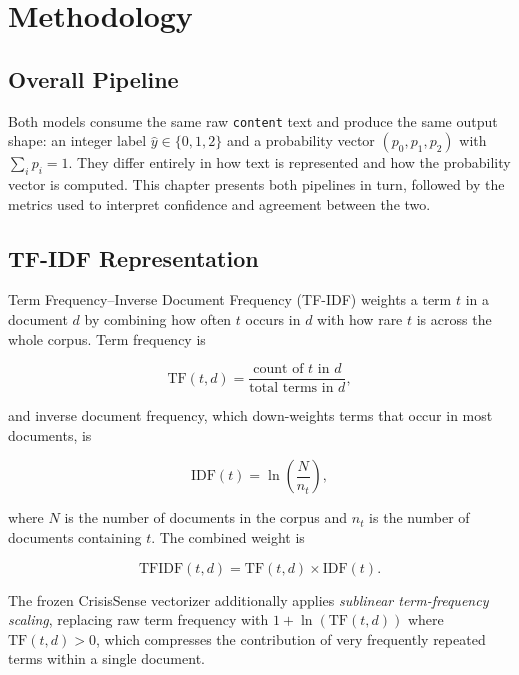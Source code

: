 \chapter{Methodology}
\label{ch:methodology}

\section{Overall Pipeline}

Both models consume the same raw \texttt{content} text and produce the same output shape: an integer label $\hat{y} \in \{0,1,2\}$ and a probability vector $(p_0, p_1, p_2)$ with $\sum_i p_i = 1$. They differ entirely in how text is represented and how the probability vector is computed. This chapter presents both pipelines in turn, followed by the metrics used to interpret confidence and agreement between the two.

\section{TF-IDF Representation}

Term Frequency--Inverse Document Frequency (TF-IDF) weights a term $t$ in a document $d$ by combining how often $t$ occurs in $d$ with how rare $t$ is across the whole corpus. Term frequency is

\begin{equation}
\mathrm{TF}(t,d) = \frac{\text{count of } t \text{ in } d}{\text{total terms in } d},
\end{equation}

and inverse document frequency, which down-weights terms that occur in most documents, is

\begin{equation}
\mathrm{IDF}(t) = \ln\!\left(\frac{N}{n_t}\right),
\end{equation}

where $N$ is the number of documents in the corpus and $n_t$ is the number of documents containing $t$. The combined weight is

\begin{equation}
\mathrm{TFIDF}(t,d) = \mathrm{TF}(t,d) \times \mathrm{IDF}(t).
\end{equation}

The frozen CrisisSense vectorizer additionally applies \emph{sublinear term-frequency scaling}, replacing raw term frequency with $1 + \ln(\mathrm{TF}(t,d))$ where $\mathrm{TF}(t,d) > 0$, which compresses the contribution of very frequently repeated terms within a single document.

